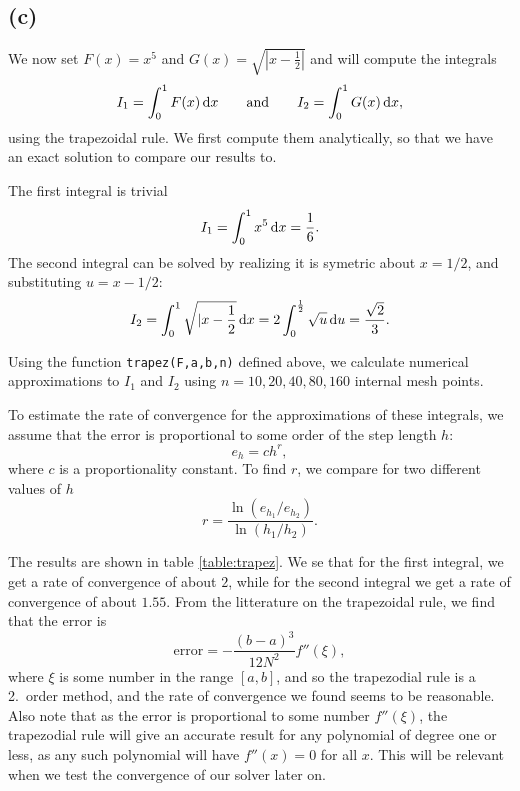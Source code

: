 \documentclass[a4paper, 11pt, notitlepage, english]{article}
\renewcommand{\d}{{\rm d}}
\begin{document}
\subsection*{(c)}
We now set $F(x) = x^5$ and $G(x) = \sqrt{|x-\frac{1}{2}|}$ and will compute the integrals
$$I_1 = \int_0^1 F(x) \, \d x \qquad \mbox{and} \qquad I_2 = \int_0^1 G(x)\, \d x,$$
using the trapezoidal rule. We first compute them analytically, so that we have an exact solution to compare our results to.

The first integral is trivial
$$I_1 = \int_0^1 x^5 \, \d x = \frac{1}{6}.$$
The second integral can be solved by realizing it is symetric about $x=1/2$, and substituting $u=x-1/2$:
$$I_2 = \int_0^1 \sqrt{|x-\frac{1}{2}}\,\d x = 2\int_0^{\frac{1}{2}} \sqrt{u}\, \d u = \frac{\sqrt{2}}{3}.$$


Using the function \verb+trapez(F,a,b,n)+ defined above, we calculate numerical approximations to $I_1$ and $I_2$ using $n=10,20,40,80,160$ internal mesh points.

To estimate the rate of convergence for the approximations of these integrals, we assume that the error is proportional to some order of the step length $h$:
$$e_h = ch^r,$$
where $c$ is a proportionality constant. To find $r$, we compare for two different values of $h$
$$r = \frac{\ln(e_{h_1}/e_{h_2})}{\ln(h_1/h_2)}.$$

The results are shown in table \ref{table:trapez}. We se that for the first integral, we get a rate of convergence of about $2$, while for the second integral we get a rate of convergence of about $1.55$. From the litterature on the trapezoidal rule, we find that the error is
$$\text{error} = -\frac{(b-a)^3}{12N^2} f''(\xi),$$
where $\xi$ is some number in the range $[a,b]$,
and so the trapezodial rule is a 2.\ order method, and the rate of convergence we found seems to be reasonable. Also note that as the error is proportional to some number $f''(\xi)$, the trapezodial rule will give an accurate result for any polynomial of degree one or less, as any such polynomial will have $f''(x) = 0$ for all $x$. This will be relevant when we test the convergence of our solver later on.

\vspace{2cm} 
\end{document}
